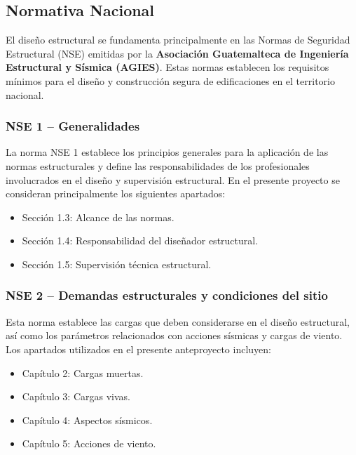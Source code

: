 \documentclass[14pt,letterpaper]{extarticle}
\begin{document}
	\subsection{Normativa Nacional}
	
	El diseño estructural se fundamenta principalmente en las Normas de Seguridad Estructural (NSE) emitidas por la \textbf{Asociación Guatemalteca de Ingeniería Estructural y Sísmica (AGIES)}. Estas normas establecen los requisitos mínimos para el diseño y construcción segura de edificaciones en el territorio nacional.
	
	\subsubsection{NSE 1 -- Generalidades}
	
	La norma NSE 1 establece los principios generales para la aplicación de las normas estructurales y define las responsabilidades de los profesionales involucrados en el diseño y supervisión estructural. En el presente proyecto se consideran principalmente los siguientes apartados:
	
	\begin{itemize}
		\item Sección 1.3: Alcance de las normas.
		\item Sección 1.4: Responsabilidad del diseñador estructural.
		\item Sección 1.5: Supervisión técnica estructural.
	\end{itemize}
	
	\subsubsection{NSE 2 -- Demandas estructurales y condiciones del sitio}
	
	Esta norma establece las cargas que deben considerarse en el diseño estructural, así como los parámetros relacionados con acciones sísmicas y cargas de viento. Los apartados utilizados en el presente anteproyecto incluyen:
	
	\begin{itemize}
		\item Capítulo 2: Cargas muertas.
		\item Capítulo 3: Cargas vivas.
		\item Capítulo 4: Aspectos sísmicos.
		\item Capítulo 5: Acciones de viento.
	\end{itemize}
	
\end{document}
